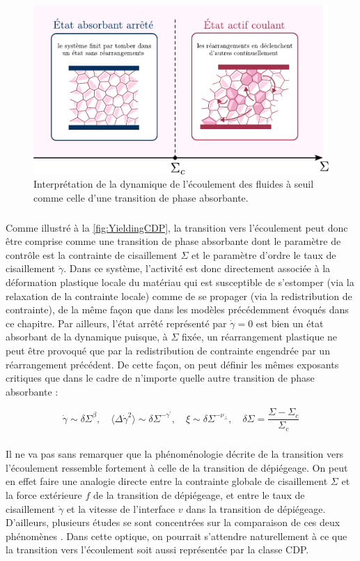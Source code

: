 \begin{figure}[h]
	\centering
	\includegraphics[width=\textwidth]{Chapitre1/Figures/InterpretationCDP/YieldingAPT.pdf}
	\caption{Interprétation de la dynamique de l'écoulement des fluides à seuil comme celle d'une transition de phase absorbante.}
	\label{fig:YieldingCDP}
\end{figure}

\subparagraph{}Comme illustré à la \autoref{fig:YieldingCDP}, la transition vers l'écoulement peut donc être comprise comme une transition de phase absorbante dont le paramètre de contrôle est la contrainte de cisaillement $\Sigma$ et le paramètre d'ordre le taux de cisaillement $\dot{\gamma}$. Dans ce système, l'activité est donc directement associée à la déformation plastique locale du matériau qui est susceptible de s'estomper (via la relaxation de la contrainte locale) comme de se propager (via la redistribution de contrainte), de la même façon que dans les modèles précédemment évoqués dans ce chapitre. Par ailleurs, l'état arrêté représenté par $\dot{\gamma} = 0$ est bien un état absorbant de la dynamique puisque, à $\Sigma$ fixée, un réarrangement plastique ne peut être provoqué que par la redistribution de contrainte engendrée par un réarrangement précédent. De cette façon, on peut définir les mêmes exposants critiques que dans le cadre de n'importe quelle autre transition de phase absorbante :

\begin{equation}
	\dot{\gamma} \sim \delta\Sigma^\beta,\quad \langle\Delta\dot{\gamma}^2\rangle \sim \delta\Sigma^{-\gamma^\prime}, \quad \xi \sim \delta\Sigma^{-\nu_\perp}, \quad \delta\Sigma = \frac{\Sigma-\Sigma_c}{\Sigma_c}
\end{equation}

\subparagraph{}Il ne va pas sans remarquer que la phénoménologie décrite de la transition vers l'écoulement ressemble fortement à celle de la transition de dépiégeage. On peut en effet faire une analogie directe entre la contrainte globale de cisaillement $\Sigma$ et la force extérieure $f$ de la transition de dépiégeage, et entre le taux de cisaillement $\dot{\gamma}$ et la vitesse de l'interface $v$ dans la transition de dépiégeage. D'ailleurs, plusieurs études se sont concentrées sur la comparaison de ces deux phénomènes \cite{lin_scaling_2014, ferrero_elastic_2019, tyukodi_depinning_2016}. Dans cette optique, on pourrait s'attendre naturellement à ce que la transition vers l'écoulement soit aussi représentée par la classe CDP.


